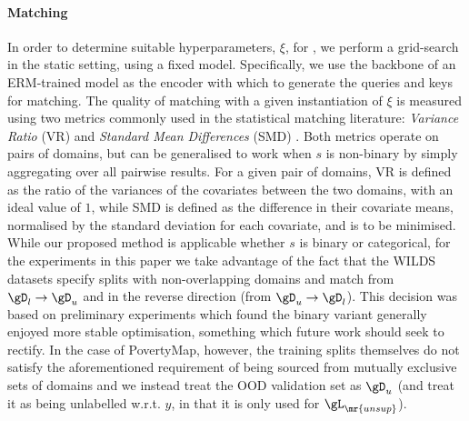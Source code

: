 \paragraph{Matching}\label{matching_imp} In order to determine suitable hyperparameters, $\xi$, for
\CNN, we perform a grid-search in the static setting, using a fixed model. Specifically, we use the
backbone of an ERM-trained model as the encoder with which to generate the queries and keys for
matching.
%
The quality of matching with a given instantiation of $\xi$ is measured using two metrics commonly
used in the statistical matching literature: \emph{Variance Ratio} (VR) and \emph{Standard Mean
Differences} (SMD) \citep{rubin2001using}. 
%
Both metrics operate on pairs of domains, but can be generalised to work when $s$ is non-binary by
simply aggregating over all pairwise results.
%
For a given pair of domains, VR is defined as the ratio of the variances of the covariates between
the two domains, with an ideal value of $1$, while SMD is defined as the difference in their
covariate means, normalised by the standard deviation for each covariate, and is to be minimised.
%
While our proposed method is applicable whether $s$ is binary or categorical, for the experiments
in this paper we take advantage of the fact that the WILDS datasets specify splits with
non-overlapping domains and match from \( \gD_l \to \gD_u \) and in the reverse direction (from
\( \gD_u \to \gD_l \)). This decision was based on preliminary experiments which found the binary
variant generally enjoyed more stable optimisation, something which future work should seek to
rectify.
%
In the case of PovertyMap, however, the training splits themselves do not satisfy the
aforementioned requirement of being sourced from mutually exclusive sets of domains and we instead
treat the OOD validation set as \( \gD_u \) (and treat it as being unlabelled w.r.t. $y$, in that it is
only used for \( \gL_\mr{unsup} \)).

